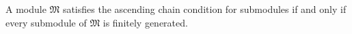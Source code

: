 A module $\mathfrak{M}$ satisfies the ascending chain condition for submodules if and only if every submodule of $\mathfrak{M}$ is finitely generated.
